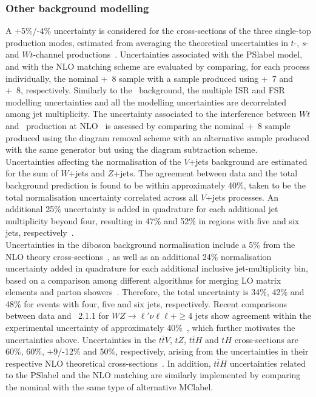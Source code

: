 \subsubsection{Other background modelling}

A +5\%/-4\% uncertainty is considered for the cross-sections of the three single-top production modes, estimated from averaging the theoretical uncertainties in $t$-, $s$- and $Wt$-channel productions~\cite{Kidonakis_2010,Kidonakis_2011}. Uncertainties associated with the \acrshort{PSlabel} model, and with the NLO matching scheme are evaluated by comparing, for each process individually, the nominal \POWHEGBOX+\PYTHIA~8 sample with a sample produced using \POWHEGBOX+\HERWIG~7 and \MGMCatNLO+\PYTHIA~8, respectively. Similarly to the \ttbar\ background, the multiple ISR and FSR modelling uncertainties and all the modelling uncertainties are decorrelated among jet multiplicity. The uncertainty associated to the interference between $Wt$ and \ttbar\ production at NLO~\cite{Frixione_2008} is assessed by comparing the nominal \POWHEGBOX+\PYTHIA~8 sample produced using the diagram removal scheme with an alternative sample produced with the same generator but using the diagram subtraction scheme.\\

Uncertainties affecting the normalisation of the $V$+jets background are estimated for the sum of $W$+jets and $Z$+jets. The agreement between data and the total background prediction is found to be within approximately 40\%, taken to be the total normalisation uncertainty correlated across all $V$+jets processes. An additional 25\% uncertainty is added in quadrature for each additional jet multiplicity beyond four, resulting in 47\% and 52\% in regions with five and six jets, respectively~\cite{0706.2569}.\\

Uncertainties in the diboson background normalisation include a 5\% from the NLO theory cross-sections~\cite{hep-ph/9905386}, as well as an additional 24\% normalisation uncertainty added in quadrature for each additional inclusive jet-multiplicity bin, based on a comparison among different algorithms for merging LO matrix elements and parton showers~\cite{0706.2569}. Therefore, the total uncertainty is 34\%, 42\% and 48\% for events with four, five and six jets, respectively. Recent comparisons between data and \SHERPA~2.1.1 for $WZ\to\ell'\nu\ell\ell+\geq$4 jets show agreement within the experimental uncertainty of approximately 40\%~\cite{WZbosommeasure}, which further motivates the uncertainties above. Uncertainties in the $t\bar{t}V$, $tZ$, $t\bar{t}H$ and $tH$ cross-sections are 60\%, 60\%, +9/-12\% and 50\%, respectively, arising from the uncertainties in their respective NLO theoretical cross-sections~\cite{CYRM-2017-002,ttVmeasurement}. In addition, $t\bar{t}H$ uncertainties related to the \acrshort{PSlabel} and the NLO matching are similarly implemented by comparing the nominal with the same type of alternative \acrshort{MClabel}.